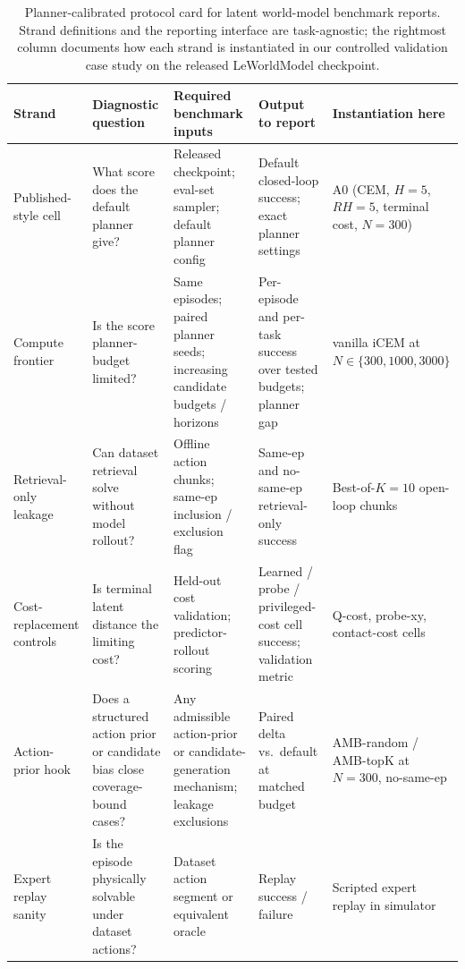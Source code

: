\documentclass{article}
\begin{document}
\begin{table}[ht]
\centering\footnotesize
\caption{Planner-calibrated protocol card for latent world-model benchmark reports. Strand definitions and the reporting interface are task-agnostic; the rightmost column documents how each strand is instantiated in our controlled validation case study on the released LeWorldModel checkpoint.}
\label{tab:protocol-card}
\renewcommand{\arraystretch}{1.05}
\begin{tabularx}{\textwidth}{@{}>{\raggedright\arraybackslash}p{2.0cm}>{\raggedright\arraybackslash}X>{\raggedright\arraybackslash}X>{\raggedright\arraybackslash}p{2.5cm}>{\raggedright\arraybackslash}p{3.1cm}@{}}
\toprule
Strand & Diagnostic question & Required benchmark inputs & Output to report & Instantiation here \\
\midrule
Published-style cell & What score does the default planner give? & Released checkpoint; eval-set sampler; default planner config & Default closed-loop success; exact planner settings & A0 (CEM, $H{=}5$, $RH{=}5$, terminal cost, $N{=}300$) \\
Compute frontier & Is the score planner-budget limited? & Same episodes; paired planner seeds; increasing candidate budgets / horizons & Per-episode and per-task success over tested budgets; planner gap & vanilla iCEM at $N \in \{300, 1000, 3000\}$ \\
Retrieval-only leakage & Can dataset retrieval solve without model rollout? & Offline action chunks; same-ep inclusion / exclusion flag & Same-ep and no-same-ep retrieval-only success & Best-of-$K{=}10$ open-loop chunks \\
Cost-replacement controls & Is terminal latent distance the limiting cost? & Held-out cost validation; predictor-rollout scoring & Learned / probe / privileged-cost cell success; validation metric & Q-cost, probe-xy, contact-cost cells \\
Action-prior hook & Does a structured action prior or candidate bias close coverage-bound cases? & Any admissible action-prior or candidate-generation mechanism; leakage exclusions & Paired delta vs.\ default at matched budget & AMB-random / AMB-topK at $N{=}300$, no-same-ep \\
Expert replay sanity & Is the episode physically solvable under dataset actions? & Dataset action segment or equivalent oracle & Replay success / failure & Scripted expert replay in simulator \\
\bottomrule
\end{tabularx}
\end{table}
\end{document}
